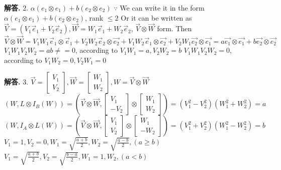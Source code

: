 \documentclass[12pt, a4paper, oneside]{article}
\newenvironment{solution}{\par\noindent\textbf{解答. }}{\par}
\begin{document}
\begin{CJK}{UTF8}{gbsn}
\begin{solution}
  2. \newline
  $\alpha(e_1\otimes e_1) + b(e_2\otimes e_2)$ \newline
  $\because$ We can write it in the form $\alpha(e_1\otimes e_1) + b(e_2\otimes e_2)$, rank $\leq 2$ \newline
  Or it can be written as $\vec{V}=(V_1\vec{e}_1+V_2\vec{e}_2), \vec{W}=W_1\vec{e}_1+W_2\vec{e}_2$, $\vec{V}\otimes\vec{W}$ form. \newline
  Then $\vec{V}\otimes\vec{W} = V_1W_1\vec{e}_1\otimes\vec{e}_1 + V_2W_2\vec{e}_2\otimes\vec{e_2} + V_1W_2\vec{e}_1\otimes\vec{e_2}+V_2W_1\vec{e_2}\otimes\vec{e_1} = a\vec{e_1}\otimes\vec{e_1} + b\vec{e_2}\otimes\vec{e_2}$ \newline
  $V_1W_1V_2W_2 = ab \neq = 0$, according to $V_1W_1=a, V_2W_2=b$ \newline
  $V_1W_1V_2W_2 = 0$, according to $V_1W_2=0, V_2W_1=0$
\end{solution}


\begin{solution}
  3. \newline
  $\vec{V} = \begin{bmatrix}
    V_1 \\ V_2
  \end{bmatrix}, \vec{W} = \begin{bmatrix}
    W_1 \\ W_2
  \end{bmatrix}, W = \vec{V}\otimes\vec{W}$ \newline
  $(W, L\otimes I_B(W)) = (\vec{V}\otimes\vec{W}, \begin{bmatrix}
    V_1 \\ -V_2
  \end{bmatrix}\otimes\begin{bmatrix}
    W_1 \\ W_2
  \end{bmatrix}) = (V_1^2 - V_2^2)(W_1^2 + W_2^2) = a$ \newline
  $(W, I_A\otimes L(W)) = (\vec{V}\otimes\vec{W}, \begin{bmatrix}
    V_1 \\ V_2
  \end{bmatrix}\otimes\begin{bmatrix}
    W_1 \\ - W_2
  \end{bmatrix}) = (V_1^2+V_2^2)(W_1^2-W_2^2) = b$ \newline
  $V_1=1, V_2=0, W_1=\sqrt{\frac{a+b}{2}}, W_2=\sqrt{\frac{a-b}{2}}, (a\geq b)$ \newline
  $V_1=\sqrt{\frac{a+b}{2}}, V_2=\sqrt{\frac{b-a}{2}}, W_1=1, W_2, (a < b)$ 
\end{solution}


\end{CJK}
\end{document}
